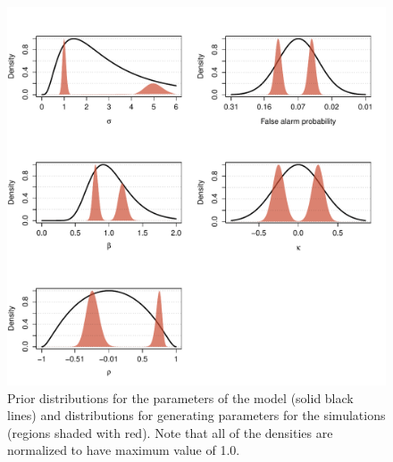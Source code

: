 \documentclass{article}\usepackage{knitr}
\begin{document}
\begin{figure}[!htb]
\centering
\begin{knitrout}
\color{fgcolor}
\includegraphics[width=\maxwidth]{figure/unnamed-chunk-15-1} 

\end{knitrout}

\caption{Prior distributions for the parameters of the model (solid black lines) and distributions for generating parameters for the simulations (regions shaded with red). Note that all of the densities are normalized to have maximum value of 1.0.}
\label{fig:priors}
\end{figure}
\end{document}
